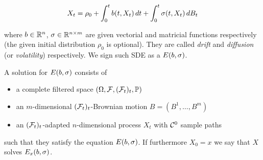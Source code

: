 \begin{equation}
X_t = \rho_0 + \int_0^t b(t, X_t) \,dt + \int_0^t \sigma(t, X_t) \,d B_t
\end{equation}\label{ch2:eq:general-sde-integral-form}

where $b \in \mathbb{R}^n$, $\sigma \in \mathbb{R}^{n \times m}$ are given vectorial and matricial functions respectively (the given initial distribution $\rho_0$ is optional).
They are called \emph{drift} and \emph{diffusion} (or \emph{volatility}) respectively.
We sign such SDE as a $E(b,\sigma)$.
\begin{definition}
A solution for $E(b,\sigma)$ consists of
\begin{itemize}
\item a complete filtered space $(\Omega, \mathcal{F}, (\mathcal{F}_t)_t, \mathbb{P}) $
\item an $m$-dimensional $(\mathcal{F}_t)_t$-Brownian motion $B = (B^1, \ldots, B^m)$
\item an $(\mathcal{F}_t)_t$-adapted $n$-dimensional process $X_t$ with $\mathcal{C}^0$ sample paths
\end{itemize}
such that they satisfy the equation $E(b,\sigma)$.
If furthermore $X_0 = x$ we say that $X$ solves $E_x(b,\sigma)$.
\end{definition}

